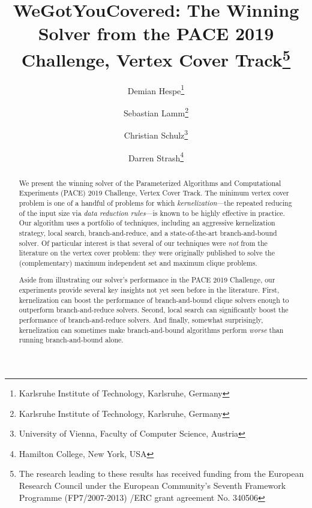 \documentclass[twoside,leqno,twocolumn]{article}
\newcommand{\mytitle}{WeGotYouCovered: The Winning Solver from the PACE 2019 Challenge, Vertex Cover Track}
\begin{document}
\title{\mytitle\thanks{
    The research leading to these results has received funding from the European Research Council under the European Community's Seventh Framework Programme (FP7/2007-2013) /ERC grant agreement No. 340506}}
\author{Demian Hespe\thanks{Karlsruhe Institute of Technology, Karlsruhe, Germany} \and Sebastian Lamm\thanks{Karlsruhe Institute of Technology, Karlsruhe, Germany} \and Christian Schulz\thanks{University of Vienna, Faculty of Computer Science, Austria} \and Darren Strash\thanks{Hamilton College, New York, USA}}


\date{}


\maketitle
\begin{abstract}
We present the winning solver of the Parameterized Algorithms and Computational Experiments (PACE) 2019 Challenge, Vertex Cover Track. The minimum vertex cover problem is one of a handful of problems for which \emph{kernelization}---the repeated reducing of the input size via \emph{data reduction rules}---is known to be highly effective in practice. Our algorithm uses a portfolio of techniques, including an aggressive kernelization strategy, local search, branch-and-reduce, and a state-of-the-art branch-and-bound solver. Of particular interest is that several of our techniques were \emph{not} from the literature on the vertex cover problem: they were originally published to solve the (complementary) maximum independent set and maximum clique problems. 

%
Aside from illustrating our solver's performance in the PACE 2019 Challenge, our experiments provide several key insights not yet seen before in the literature.
First, kernelization can boost the performance of branch-and-bound clique solvers enough to outperform branch-and-reduce solvers. Second, local search can significantly boost the performance of branch-and-reduce solvers. And finally, somewhat surprisingly, kernelization can sometimes make branch-and-bound algorithms perform \emph{worse} than running branch-and-bound alone.
\end{abstract}
\end{document}
